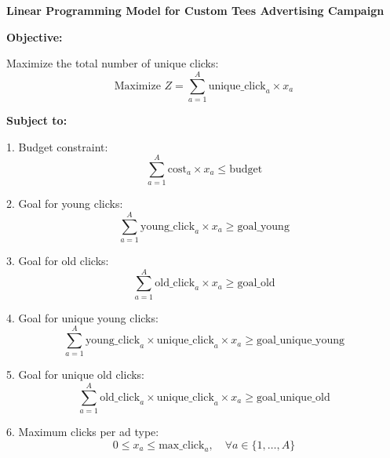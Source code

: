 \documentclass{article}
\begin{document}
\textbf{Linear Programming Model for Custom Tees Advertising Campaign}

\textbf{Objective:}

Maximize the total number of unique clicks:
\[
\text{Maximize } Z = \sum_{a=1}^{A} \text{unique\_click}_{a} \times x_a
\]

\textbf{Subject to:}

1. Budget constraint:
\[
\sum_{a=1}^{A} \text{cost}_{a} \times x_a \leq \text{budget}
\]

2. Goal for young clicks:
\[
\sum_{a=1}^{A} \text{young\_click}_{a} \times x_a \geq \text{goal\_young}
\]

3. Goal for old clicks:
\[
\sum_{a=1}^{A} \text{old\_click}_{a} \times x_a \geq \text{goal\_old}
\]

4. Goal for unique young clicks:
\[
\sum_{a=1}^{A} \text{young\_click}_{a} \times \text{unique\_click}_{a} \times x_a \geq \text{goal\_unique\_young}
\]

5. Goal for unique old clicks:
\[
\sum_{a=1}^{A} \text{old\_click}_{a} \times \text{unique\_click}_{a} \times x_a \geq \text{goal\_unique\_old}
\]

6. Maximum clicks per ad type:
\[
0 \leq x_a \leq \text{max\_click}_{a}, \quad \forall a \in \{1, \ldots, A\}
\]
\end{document}
